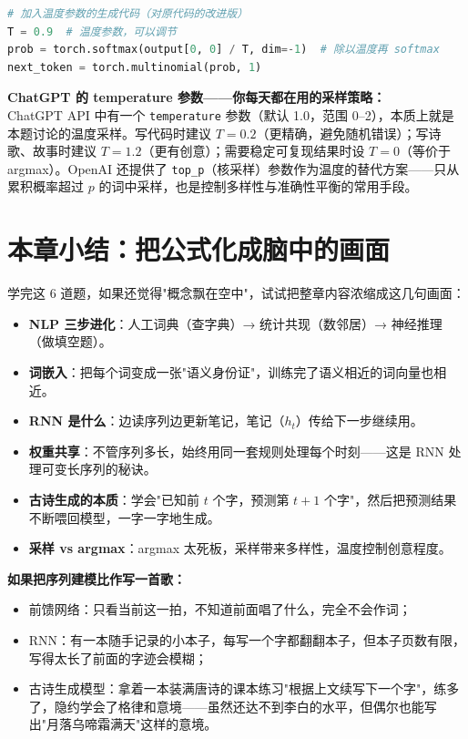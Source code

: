 \documentclass[a4paper,11pt]{ctexart}
\begin{document}
\begin{solutionbox}[参考答案与详细解析]
    \begin{lstlisting}[language=Python]
# 加入温度参数的生成代码（对原代码的改进版）
T = 0.9  # 温度参数，可以调节
prob = torch.softmax(output[0, 0] / T, dim=-1)  # 除以温度再 softmax
next_token = torch.multinomial(prob, 1)
    \end{lstlisting}
\end{solutionbox}

\begin{appbox}[现实应用场景]
    \textbf{ChatGPT 的 temperature 参数——你每天都在用的采样策略：}\\
    ChatGPT API 中有一个 \texttt{temperature} 参数（默认 1.0，范围 0--2），本质上就是本题讨论的温度采样。写代码时建议 $T=0.2$（更精确，避免随机错误）；写诗歌、故事时建议 $T=1.2$（更有创意）；需要稳定可复现结果时设 $T=0$（等价于 argmax）。OpenAI 还提供了 \texttt{top\_p}（核采样）参数作为温度的替代方案——只从累积概率超过 $p$ 的词中采样，也是控制多样性与准确性平衡的常用手段。
\end{appbox}

\section{本章小结：把公式化成脑中的画面}

学完这 6 道题，如果还觉得"概念飘在空中"，试试把整章内容浓缩成这几句画面：

\begin{itemize}
    \item \textbf{NLP 三步进化}：人工词典（查字典）→ 统计共现（数邻居）→ 神经推理（做填空题）。
    \item \textbf{词嵌入}：把每个词变成一张"语义身份证"，训练完了语义相近的词向量也相近。
    \item \textbf{RNN 是什么}：边读序列边更新笔记，笔记（$h_t$）传给下一步继续用。
    \item \textbf{权重共享}：不管序列多长，始终用同一套规则处理每个时刻——这是 RNN 处理可变长序列的秘诀。
    \item \textbf{古诗生成的本质}：学会"已知前 $t$ 个字，预测第 $t+1$ 个字"，然后把预测结果不断喂回模型，一字一字地生成。
    \item \textbf{采样 vs argmax}：argmax 太死板，采样带来多样性，温度控制创意程度。
\end{itemize}

\begin{metaphorbox}[给零基础读者的一句总比喻]
    \textbf{如果把序列建模比作写一首歌：}
    \begin{itemize}
        \item 前馈网络：只看当前这一拍，不知道前面唱了什么，完全不会作词；
        \item RNN：有一本随手记录的小本子，每写一个字都翻翻本子，但本子页数有限，写得太长了前面的字迹会模糊；
        \item 古诗生成模型：拿着一本装满唐诗的课本练习"根据上文续写下一个字"，练多了，隐约学会了格律和意境——虽然还达不到李白的水平，但偶尔也能写出"月落乌啼霜满天"这样的意境。
    \end{itemize}
\end{metaphorbox}
\end{document}

